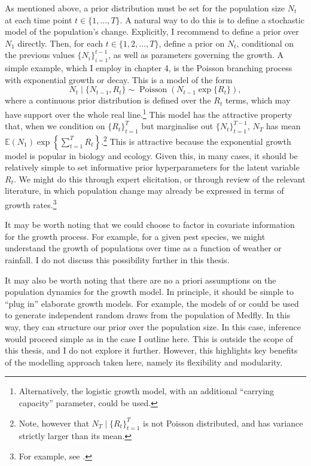 \documentclass[
  oneside]{book}
\begin{document}
As mentioned above, a prior distribution must be set for the population size \(N_t\) at each time point \(t \in \{1, \ldots, T\}\). A natural way to do this is to define a stochastic model of the population's change. Explicitly, I recommend to define a prior over \(N_1\) directly. Then, for each \(t \in \{1,2, \ldots, T\}\), define a prior on \(N_t\), conditional on the previous values \(\{N_i\}_{i=1}^{t-1}\), as well as parameters governing the growth. A simple example, which I employ in chapter 4, is the Poisson branching process with exponential growth or decay. This is a model of the form
\[
N_t \mid \{N_{t-1}, R_t\} \sim \operatorname{Poisson}(N_{t-1} \exp \{R_t\}),
\]
where a continuous prior distribution is defined over the \(R_t\) terms, which may have support over the whole real line.\footnote{Alternatively, the logistic growth model, with an additional ``carrying capacity'' parameter, could be used.} This model has the attractive property that, when we condition on \(\{R_t\}_{t=1}^T\) but marginalise out \(\{N_t\}_{t=1}^{T-1}\), \(N_T\) has mean \(\mathbb E(N_1) \exp \left\{ \sum_{t=1}^T R_t \right\}\).\footnote{Note, however that \(N_T \mid \{R_t\}_{t=1}^T\) is not Poisson distributed, and has variance strictly larger than its mean.} This is attractive because the exponential growth model is popular in biology and ecology. Given this, in many cases, it should be relatively simple to set informative prior hyperparameters for the latent variable \(R_t\). We might do this through expert elicitation, or through review of the relevant literature, in which population change may already be expressed in terms of growth rates.\footnote{For example, see \citet{papadopoulos2002}.}

It may be worth noting that we could choose to factor in covariate information for the growth process. For example, for a given pest species, we might understand the growth of populations over time as a function of weather or rainfall. I do not discuss this possibility further in this thesis.

It may also be worth noting that there are no a priori assumptions on the population dynamics for the growth model. In principle, it should be simple to ``plug in'' elaborate growth models. For example, the models of \citet{lux2018} or \citet{manoukis2014} could be used to generate independent random draws from the population of Medfly. In this way, they can structure our prior over the population size. In this case, inference would proceed simple as in the case I outline here. This is outside the scope of this thesis, and I do not explore it further. However, this highlights key benefits of the modelling approach taken here, namely its flexibility and modularity.
\end{document}
